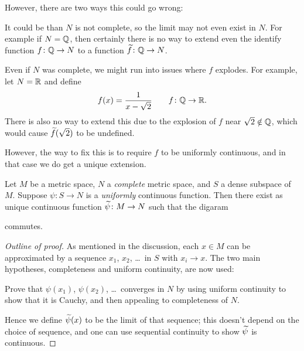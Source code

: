 However, there are two ways this could go wrong:
\begin{example}
	\listhack
	\begin{enumerate}[(a)]
		\ii It could be than $N$ is not complete,
		so the limit may not even exist in $N$.
		For example if $N = \mathbb Q$,
		then certainly there is no way to
		extend even the identify function $f \colon \mathbb Q \to N$
		to a function $\widetilde f \colon \mathbb Q \to N$.

		\ii Even if $N$ was complete, we might run into issues
		where $f$ explodes.
		For example, let $N = \mathbb R$ and define
		\[ f(x) = \frac{1}{x-\sqrt2} \qquad f \colon \mathbb Q \to \mathbb R. \]
		There is also no way to extend this
		due to the explosion of $f$ near $\sqrt2 \notin \mathbb Q$,
		which would cause $\widetilde f(\sqrt2)$ to be undefined.
	\end{enumerate}
\end{example}
However, the way to fix this is to require $f$ to be uniformly continuous,
and in that case we do get a unique extension.

\begin{theorem}
	Let $M$ be a metric space, $N$ a \emph{complete} metric space,
	and $S$ a dense subspace of $M$.
	Suppose $\psi \colon S \to N$ is a \emph{uniformly} continuous function.
	Then there exist as unique continuous function $\widetilde \psi \colon M \to N$
	such that the digaram
	\begin{center}
	\end{center}
	commutes.
\end{theorem}
\begin{proof}
	[Outline of proof]
	As mentioned in the discussion,
	each $x \in M$ can be approximated by a
	sequence $x_1$, $x_2$, \dots\ in $S$ with $x_i \to x$.
	The two main hypotheses, completeness and uniform continuity,
	are now used:
	\begin{exercise}
		Prove that $\psi(x_1)$, $\psi(x_2)$, \dots\ converges in $N$
		by using uniform continuity to show that it is Cauchy,
		and then appealing to completeness of $N$.
	\end{exercise}
	Hence we define $\widetilde \psi(x)$ to be the limit of that sequence;
	this doesn't depend on the choice of sequence,
	and one can use sequential continuity to show $\widetilde \psi$ is continuous.
\end{proof}

